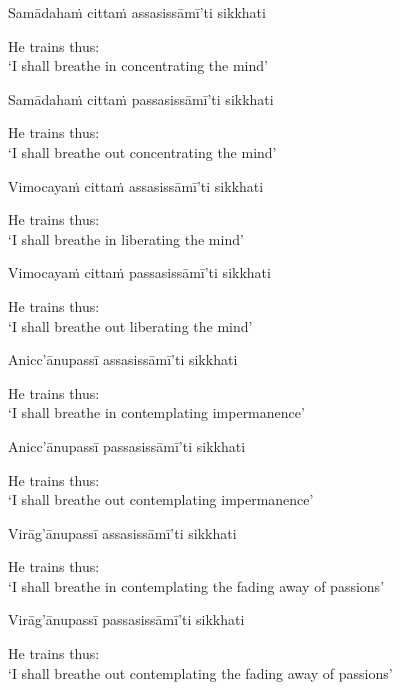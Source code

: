 Samādahaṁ cittaṁ assasissāmī'ti sikkhati

\begin{english}
  He trains thus:\\
  `I shall breathe in concentrating the mind'
\end{english}

Samādahaṁ cittaṁ passasissāmī'ti sikkhati

\begin{english}
  He trains thus:\\
  `I shall breathe out concentrating the mind'
\end{english}

Vimocayaṁ cittaṁ assasissāmī'ti sikkhati

\begin{english}
  He trains thus:\\
  `I shall breathe in liberating the mind'
\end{english}

Vimocayaṁ cittaṁ passasissāmī'ti sikkhati

\begin{english}
  He trains thus:\\
  `I shall breathe out liberating the mind'
\end{english}

Anicc'ānupassī assasissāmī'ti sikkhati

\begin{english}
  He trains thus:\\
  `I shall breathe in contemplating impermanence'
\end{english}

Anicc'ānupassī passasissāmī'ti sikkhati

\begin{english}
  He trains thus:\\
  `I shall breathe out contemplating impermanence'
\end{english}

Virāg'ānupassī assasissāmī'ti sikkhati

\begin{english}
  He trains thus:\\
  `I shall breathe in contemplating the fading away of passions'
\end{english}

Virāg'ānupassī passasissāmī'ti sikkhati

\begin{english}
  He trains thus:\\
  `I shall breathe out contemplating the fading away of passions'
\end{english}

